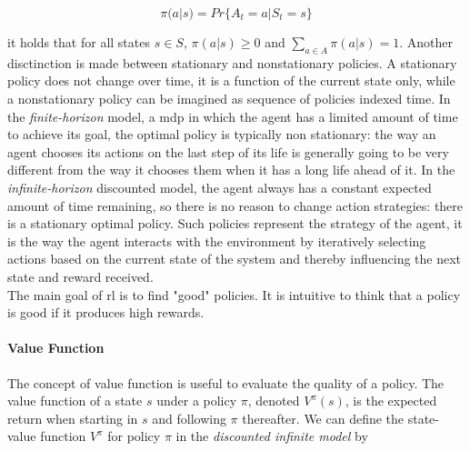 $$\pi(a|s) = Pr\{A_t = a | S_t = s\}$$

it holds that for all states $s \in S$, $\pi(a|s) \geq 0$ and $\sum_{a \in A} \pi(a|s) = 1$. 
Another disctinction is made between stationary and nonstationary policies. A stationary policy
does not change over time, it is a function of the current state only,
while a nonstationary policy can be imagined as sequence of policies indexed time. 
In the \emph{finite-horizon} model, a \gls{mdp} in which the agent has a limited amount of time to achieve its goal, 
the optimal policy is typically non stationary: the way an agent chooses its actions on the last step 
of its life is generally going to be very different from the way it chooses them when it has a long
life ahead of it. In the \emph{infinite-horizon} discounted model, the agent always has a constant
expected amount of time remaining, so there is no reason to change action strategies: there
is a stationary optimal policy.   
Such policies represent the strategy of the agent, it is the way the agent interacts with the environment
by iteratively selecting actions based on the current state of the system and thereby influencing the next state and 
reward received. \\
The main goal of \gls{rl} is to find "good" policies. It is intuitive to think that a policy is good 
if it produces high rewards.


\paragraph{Value Function} The concept of value function is useful to evaluate the 
quality of a policy. The value function of a state \(s\) under a policy \(\pi\), denoted \(V^{\pi}(s)\), 
is the expected return when starting in \(s\) and following \(\pi\) thereafter. 
We can define the state-value function  \(V^{\pi}\) for policy \(\pi\) in the \emph{discounted infinite model} 
by

